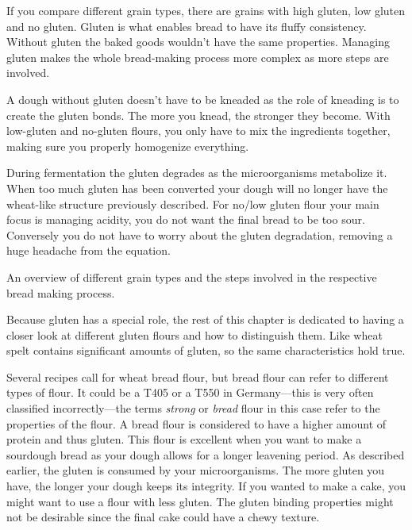 If you compare different grain types, there are grains with high gluten, low gluten
and no gluten. Gluten is what enables bread to have its fluffy consistency.
Without gluten the baked goods wouldn't have the same properties. Managing
gluten makes the whole bread-making process more complex as more steps are involved.

A dough without gluten doesn't have to be kneaded as the role of kneading is
to create
the gluten bonds. The more you knead, the stronger they become. With low-gluten
and no-gluten flours, you only have to mix the ingredients together, making
sure you properly homogenize everything.

During fermentation
the gluten degrades as the microorganisms metabolize it. When too much gluten
has been converted your dough will no longer have the wheat-like structure previously
described. For no/low gluten flour your main focus is managing acidity, you do not
want the final bread to be too sour. Conversely you do not have to worry about
the gluten degradation, removing a huge headache from the equation.

\begin{table}[!htb]
    \begin{center}
        
        \caption[Different types of grain]{An overview of different grain
          types and the steps involved in the respective bread making process.}
    \end{center}
\end{table}

Because gluten has a special role, the rest of this chapter is dedicated to having a
closer look at different gluten flours and how to distinguish them. Like wheat
spelt contains significant amounts of gluten, so the same characteristics hold
true.

Several recipes call for wheat bread flour, but bread flour can refer to different types
of flour. It could be a T405 or a T550 in Germany---this is very often
classified incorrectly---the terms \emph{strong} or \emph{bread} flour in this case
refer to the properties of the flour. A bread flour is considered to have a
higher amount of protein and thus gluten. This flour is excellent when you
want to make a sourdough bread as your dough allows for a longer leavening
period. As described earlier, the gluten is consumed by your microorganisms.
The more gluten you have, the longer your dough keeps its integrity. If you wanted
to make a cake, you might want to use a flour with less gluten. The gluten binding
properties might not be desirable since the final cake could have a chewy texture.

